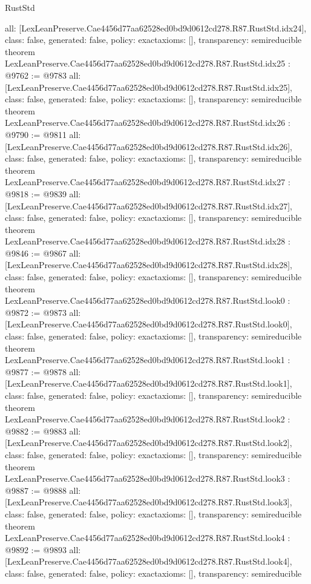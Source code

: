 \begin{lexlean}{RustStd}
\begin{coremodule}
{  all: [LexLeanPreserve.Cae4456d77aa62528ed0bd9d0612cd278.R87.RustStd.idx24],
  class: false,
  generated: false,
  policy: exact{axioms: []},
  transparency: semireducible
}
theorem LexLeanPreserve.Cae4456d77aa62528ed0bd9d0612cd278.R87.RustStd.idx25 : @9762 := @9783 {
  all: [LexLeanPreserve.Cae4456d77aa62528ed0bd9d0612cd278.R87.RustStd.idx25],
  class: false,
  generated: false,
  policy: exact{axioms: []},
  transparency: semireducible
}
theorem LexLeanPreserve.Cae4456d77aa62528ed0bd9d0612cd278.R87.RustStd.idx26 : @9790 := @9811 {
  all: [LexLeanPreserve.Cae4456d77aa62528ed0bd9d0612cd278.R87.RustStd.idx26],
  class: false,
  generated: false,
  policy: exact{axioms: []},
  transparency: semireducible
}
theorem LexLeanPreserve.Cae4456d77aa62528ed0bd9d0612cd278.R87.RustStd.idx27 : @9818 := @9839 {
  all: [LexLeanPreserve.Cae4456d77aa62528ed0bd9d0612cd278.R87.RustStd.idx27],
  class: false,
  generated: false,
  policy: exact{axioms: []},
  transparency: semireducible
}
theorem LexLeanPreserve.Cae4456d77aa62528ed0bd9d0612cd278.R87.RustStd.idx28 : @9846 := @9867 {
  all: [LexLeanPreserve.Cae4456d77aa62528ed0bd9d0612cd278.R87.RustStd.idx28],
  class: false,
  generated: false,
  policy: exact{axioms: []},
  transparency: semireducible
}
theorem LexLeanPreserve.Cae4456d77aa62528ed0bd9d0612cd278.R87.RustStd.look0 : @9872 := @9873 {
  all: [LexLeanPreserve.Cae4456d77aa62528ed0bd9d0612cd278.R87.RustStd.look0],
  class: false,
  generated: false,
  policy: exact{axioms: []},
  transparency: semireducible
}
theorem LexLeanPreserve.Cae4456d77aa62528ed0bd9d0612cd278.R87.RustStd.look1 : @9877 := @9878 {
  all: [LexLeanPreserve.Cae4456d77aa62528ed0bd9d0612cd278.R87.RustStd.look1],
  class: false,
  generated: false,
  policy: exact{axioms: []},
  transparency: semireducible
}
theorem LexLeanPreserve.Cae4456d77aa62528ed0bd9d0612cd278.R87.RustStd.look2 : @9882 := @9883 {
  all: [LexLeanPreserve.Cae4456d77aa62528ed0bd9d0612cd278.R87.RustStd.look2],
  class: false,
  generated: false,
  policy: exact{axioms: []},
  transparency: semireducible
}
theorem LexLeanPreserve.Cae4456d77aa62528ed0bd9d0612cd278.R87.RustStd.look3 : @9887 := @9888 {
  all: [LexLeanPreserve.Cae4456d77aa62528ed0bd9d0612cd278.R87.RustStd.look3],
  class: false,
  generated: false,
  policy: exact{axioms: []},
  transparency: semireducible
}
theorem LexLeanPreserve.Cae4456d77aa62528ed0bd9d0612cd278.R87.RustStd.look4 : @9892 := @9893 {
  all: [LexLeanPreserve.Cae4456d77aa62528ed0bd9d0612cd278.R87.RustStd.look4],
  class: false,
  generated: false,
  policy: exact{axioms: []},
  transparency: semireducible
}
\end{coremodule}
\end{lexlean}
